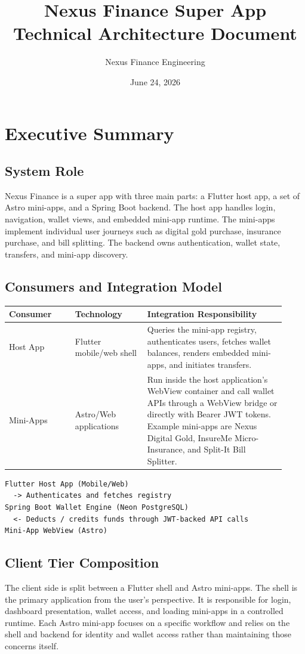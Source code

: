 \documentclass[11pt,a4paper]{article}
\title{\textbf{Nexus Finance Super App}\\Technical Architecture Document}
\author{Nexus Finance Engineering}
\date{June 24, 2026}
\begin{document}
\maketitle
\thispagestyle{empty}

\section{Executive Summary}
\subsection{System Role}
Nexus Finance is a super app with three main parts: a Flutter host app, a set of Astro mini-apps, and a Spring Boot backend. The host app handles login, navigation, wallet views, and embedded mini-app runtime. The mini-apps implement individual user journeys such as digital gold purchase, insurance purchase, and bill splitting. The backend owns authentication, wallet state, transfers, and mini-app discovery.

\subsection{Consumers and Integration Model}
\begin{longtable}{p{0.22\linewidth} p{0.24\linewidth} p{0.46\linewidth}}
\toprule
\textbf{Consumer} & \textbf{Technology} & \textbf{Integration Responsibility} \\
\midrule
Host App & Flutter mobile/web shell & Queries the mini-app registry, authenticates users, fetches wallet balances, renders embedded mini-apps, and initiates transfers. \\
Mini-Apps & Astro/Web applications & Run inside the host application's WebView container and call wallet APIs through a WebView bridge or directly with Bearer JWT tokens. Example mini-apps are Nexus Digital Gold, InsureMe Micro-Insurance, and Split-It Bill Splitter. \\
\bottomrule
\end{longtable}

\begin{lstlisting}[language={},caption={Integration flow}]
Flutter Host App (Mobile/Web)
  -> Authenticates and fetches registry
Spring Boot Wallet Engine (Neon PostgreSQL)
  <- Deducts / credits funds through JWT-backed API calls
Mini-App WebView (Astro)
\end{lstlisting}

\subsection{Client Tier Composition}
The client side is split between a Flutter shell and Astro mini-apps. The shell is the primary application from the user's perspective. It is responsible for login, dashboard presentation, wallet access, and loading mini-apps in a controlled runtime. Each Astro mini-app focuses on a specific workflow and relies on the shell and backend for identity and wallet access rather than maintaining those concerns itself.
\end{document}
